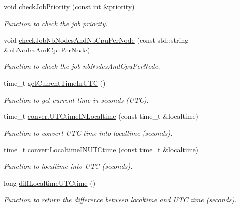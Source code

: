 \begin{DoxyCompactItemize}
void \hyperlink{namespacevishnu_aa59f3181383172b450f3621192c3ad26}{checkJobPriority} (const int \&priority)
\begin{DoxyCompactList}\small\item\em Function to check the job priority. \item\end{DoxyCompactList}\item 
void \hyperlink{namespacevishnu_a66c4f962fb018f2e5e89d81f06357ca3}{checkJobNbNodesAndNbCpuPerNode} (const std::string \&nbNodesAndCpuPerNode)
\begin{DoxyCompactList}\small\item\em Function to check the job nbNodesAndCpuPerNode. \item\end{DoxyCompactList}\item 
time\_\-t \hyperlink{namespacevishnu_a34810356a494e9db0e924c76889474b0}{getCurrentTimeInUTC} ()
\begin{DoxyCompactList}\small\item\em Function to get current time in seconds (UTC). \item\end{DoxyCompactList}\item 
time\_\-t \hyperlink{namespacevishnu_a912b9d87fc92812a07bb7f6dce8dcb85}{convertUTCtimeINLocaltime} (const time\_\-t \&localtime)
\begin{DoxyCompactList}\small\item\em Function to convert UTC time into localtime (seconds). \item\end{DoxyCompactList}\item 
time\_\-t \hyperlink{namespacevishnu_a7607f0891ab382dcb2343a36d9b25190}{convertLocaltimeINUTCtime} (const time\_\-t \&localtime)
\begin{DoxyCompactList}\small\item\em Function to localtime into UTC (seconds). \item\end{DoxyCompactList}\item 
long \hyperlink{namespacevishnu_a34f4596f7c86c2f9bd6b6bd49be69e6f}{diffLocaltimeUTCtime} ()
\begin{DoxyCompactList}\small\item\em Function to return the difference between localtime and UTC time (seconds). \item\end{DoxyCompactList}\item 

\end{DoxyCompactItemize}
